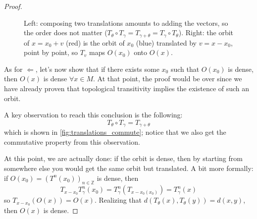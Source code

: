 \begin{proof}
\begin{figure}[ht]
    \caption{Left: composing two translations amounts to adding the vectors, so the order does not
    matter ($T_\theta\circ T_\gamma=T_{\gamma+\theta}=T_\gamma\circ T_\theta$). Right: the orbit of
    $x=x_0+v$ (red) is the orbit of $x_0$ (blue) translated by $v=x-x_0$, point by point, so $T_v$
    maps $O(x_0)$ onto $O(x)$.}
    \label{fig:translations_commute}
\end{figure}

    As for $\Leftarrow$, let's now show that if there exists some $x_0$ such that $O(x_0)$ is dense, then $O(x)$ is dense $\forall x\in M$. At that point, the proof would be over since we have already proven that topological transitivity implies the existence of such an orbit.
    
    A key observation to reach this conclusion is the following: \begin{equation*}
        T_{\theta}\circ T_{\gamma}=T_{\gamma+\theta}
    \end{equation*}
    which is shown in \autoref{fig:translations_commute}; notice that we also get the commutative property from this observation. 
    
    At this point, we are actually done: if the orbit is dense, then by starting from somewhere else you would get the same orbit but translated. A bit more formally: if $O(x_0)=(T^n(x_0))_{n\in\mathbb{Z}}$ is dense, then \begin{equation*}
        T_{x-x_0}T^n_{\gamma}(x_0)=T_{\gamma}^n(T_{x-x_0(x_0)})=T_{\gamma}^n(x)
    \end{equation*}
    so $T_{x-x_0}(O(x))=O(x)$. Realizing that $d(T_{\theta}(x), T_{\theta}(y))=d(x,y)$, then $O(x)$ is dense. 
\end{proof}

